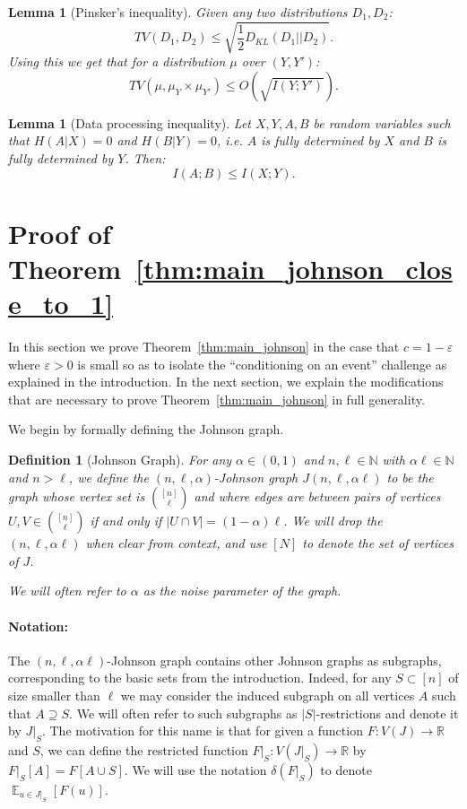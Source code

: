 \documentclass[11pt]{article}
\DeclareMathOperator*{\E}{\mathbb{E}}
\DeclareMathOperator*{\Cov}{\mathbb{C}ov}
\def \N {\mathbb{N}}
\def \eps {{\varepsilon}}
\newtheorem{lemma}[theorem]{Lemma}
\newtheorem{definition}[theorem]{Definition}
\theoremstyle{definition}
\begin{document}
\begin{lemma}[Pinsker's inequality]
Given any two distributions $D_1,D_2$:
\[TV(D_1, D_2) \leq \sqrt{\frac{1}{2}D_{KL}(D_1 || D_2)}.\]
Using this we get that for a distribution $\mu$ over $(Y,Y')$:
\[TV(\mu, \mu_Y \times \mu_{Y'}) \leq O(\sqrt{I(Y;Y')}).\]
\end{lemma}

\begin{lemma}[Data processing inequality]
Let $X,Y,A,B$ be random variables such that $H(A|X) = 0$ and $H(B|Y) = 0$, i.e. $A$ is fully determined by $X$ and $B$ is fully determined by $Y$. Then:
\[I(A;B) \leq I(X;Y).\]
\end{lemma}








\section{Proof of Theorem~\ref{thm:main_johnson_close_to_1}}
\label{sec:johnson_1}
In this section we prove Theorem~\ref{thm:main_johnson} 
in the case that $c = 1-\eps$ where $\eps>0$ is small 
so as to isolate the ``conditioning on an event'' challenge as explained in the introduction. In the next section, we explain the modifications that are necessary to prove Theorem~\ref{thm:main_johnson} in full generality. 

We begin by formally defining the Johnson graph.

\begin{definition}[Johnson Graph] \label{def:johnson}
For any $\alpha \in (0,1)$ and $n,\ell \in \N$ with $\alpha\ell \in \N$ and $n > \ell$, we define the \emph{$(n,\ell,\alpha)$-Johnson graph $J(n,\ell,\alpha\ell )$} to be the graph whose vertex set is $\binom{[n]}{\ell}$ and where edges are between pairs of vertices $U,V \in \binom{[n]}{\ell}$ if and only if $|U \cap V| = (1-\alpha)\ell$. We will drop the $(n,\ell,\alpha\ell)$ when clear from context,  
and use $[N]$ to denote the set of vertices of $J$. 

We will often refer to $\alpha$ as the noise parameter 
of the graph.
\end{definition}

\paragraph{Notation:}
The $(n,\ell,\alpha\ell)$-Johnson graph contains other Johnson graphs as subgraphs, corresponding to the basic sets from 
the introduction. Indeed, for any $S \subset [n]$ of size 
smaller than $\ell$ we may consider the induced subgraph on 
all vertices $A$ such that $A\supseteq S$. We will often 
refer to such subgraphs as $|S|$-restrictions and denote it by $J|_S$. The 
motivation for this name is that for given a function $F\colon V(J)\to \mathbb{R}$ 
and $S$, we can define the restricted function 
$F|_{S}\colon V(J|_S)\to\mathbb{R}$ by $F|_{S}[A] = F[A\cup S]$. We will use the notation $\delta(F|_S)$ to denote $\E_{u \in J|_S}[F(u)]$.
\end{document}
